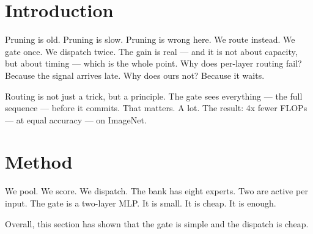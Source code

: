 \documentclass{article}
\begin{document}
\section{Introduction}
Pruning is old. Pruning is slow. Pruning is wrong here. We route instead. We gate
once. We dispatch twice. The gain is real --- and it is not about capacity, but
about timing --- which is the whole point. Why does per-layer routing fail? Because
the signal arrives late. Why does ours not? Because it waits.

Routing is not just a trick, but a principle. The gate sees everything --- the full
sequence --- before it commits. That matters. A lot. The result: 4x fewer FLOPs ---
at equal accuracy --- on ImageNet.

\section{Method}
We pool. We score. We dispatch. The bank has eight experts. Two are active per input.
The gate is a two-layer MLP. It is small. It is cheap. It is enough.

Overall, this section has shown that the gate is simple and the dispatch is cheap.
\end{document}

